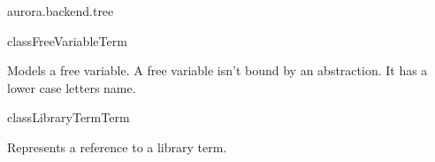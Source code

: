 \begin{texdocpackage}{aurora.backend.tree}
\begin{texdocclass}{class}{FreeVariable}{Term}{}
\label{texdoclet:aurora.backend.tree.FreeVariable}
\begin{texdocclassintro}
Models a free variable. A free variable isn't bound by an abstraction.
 It has a lower case letters name.\end{texdocclassintro}
\begin{texdocclassfields}
\end{texdocclassfields}
\begin{texdocclassconstructors}
\end{texdocclassconstructors}
\begin{texdocclassmethods}
\end{texdocclassmethods}
\end{texdocclass}


\begin{texdocclass}{class}{LibraryTerm}{Term}{}
\label{texdoclet:aurora.backend.tree.LibraryTerm}
\begin{texdocclassintro}
Represents a reference to a library term.\end{texdocclassintro}
\begin{texdocclassfields}
\end{texdocclassfields}
\begin{texdocclassconstructors}
\end{texdocclassconstructors}
\begin{texdocclassmethods}
\end{texdocclassmethods}
\end{texdocclass}



\end{texdocpackage}
